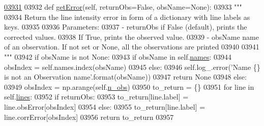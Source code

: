 \begin{DoxyCode}
\hypertarget{classpyneb_1_1core_1_1pynebcore_1_1_observation_l03931}{}\hyperlink{classpyneb_1_1core_1_1pynebcore_1_1_observation_a96cf2360b9b568a675d2c8177d47b3d2}{03931} 
03932     \textcolor{keyword}{def }\hyperlink{classpyneb_1_1core_1_1pynebcore_1_1_observation_a96cf2360b9b568a675d2c8177d47b3d2}{getError}(self, returnObs=False, obsName=None):
03933         \textcolor{stringliteral}{"""}
03934 \textcolor{stringliteral}{        Return the line intensity error in form of a dictionary with line labels as keys.}
03935 \textcolor{stringliteral}{        }
03936 \textcolor{stringliteral}{        Parameters:}
03937 \textcolor{stringliteral}{            - returnObs  if False (default), prints the corrected values. }
03938 \textcolor{stringliteral}{                            If True, prints the observed value. }
03939 \textcolor{stringliteral}{            - obsName    name of an observation. If not set or None, all the observations are printed}
03940 \textcolor{stringliteral}{            }
03941 \textcolor{stringliteral}{        """}
03942         \textcolor{keywordflow}{if} obsName \textcolor{keywordflow}{is} \textcolor{keywordflow}{not} \textcolor{keywordtype}{None}:
03943             \textcolor{keywordflow}{if} obsName \textcolor{keywordflow}{in} self.\hyperlink{classpyneb_1_1core_1_1pynebcore_1_1_observation_a3f365d0b1488b2eba300bf71caf23c17}{names}:
03944                 obsIndex = self.names.index(obsName)
03945             \textcolor{keywordflow}{else}:
03946                 self.log\_.error(\textcolor{stringliteral}{'Name \{\} is not an Observation name'}.format(obsName))
03947                 \textcolor{keywordflow}{return} \textcolor{keywordtype}{None}
03948         \textcolor{keywordflow}{else}:
03949             obsIndex = np.arange(self.\hyperlink{classpyneb_1_1core_1_1pynebcore_1_1_observation_a3c9122167ef525b73a62d39d4b5c4239}{n\_obs})
03950         to\_return = \{\}
03951         \textcolor{keywordflow}{for} line \textcolor{keywordflow}{in} self.\hyperlink{classpyneb_1_1core_1_1pynebcore_1_1_observation_a78332043ca9f290590edf6b8a1e5b767}{lines}:
03952             \textcolor{keywordflow}{if} returnObs:
03953                 to\_return[line.label] = line.obsError[obsIndex]
03954             \textcolor{keywordflow}{else}:
03955                 to\_return[line.label] = line.corrError[obsIndex]
03956         \textcolor{keywordflow}{return} to\_return
03957     
    
\end{DoxyCode}
